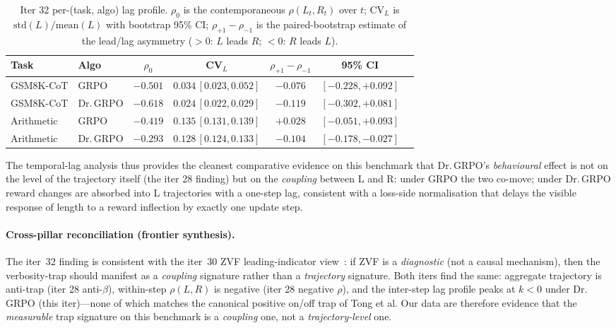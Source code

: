 \documentclass{article}
\begin{document}
\begin{table}[htbp]
\centering\small
\caption{Iter 32 per-(task, algo) lag profile. $\rho_0$ is the
contemporaneous $\rho(L_t,R_t)$ over $t$; CV$_L$ is $\mathrm{std}(L)/\mathrm{mean}(L)$
with bootstrap 95\% CI; $\rho_{+1}{-}\rho_{-1}$ is the paired-bootstrap
estimate of the lead/lag asymmetry ($>0$: $L$ leads $R$; $<0$: $R$
leads $L$).}
\label{tab:length-bias-iter32}
\begin{tabular}{llccccc}
\hline
Task & Algo & $\rho_0$ & CV$_L$ & $\rho_{+1}{-}\rho_{-1}$ & 95\% CI \\
\hline
GSM8K-CoT & GRPO & $-0.501$ & $0.034\,[0.023,0.052]$ & $-0.076$ & $[-0.228,+0.092]$ \\
GSM8K-CoT & Dr.\,GRPO & $-0.618$ & $0.024\,[0.022,0.029]$ & $-0.119$ & $[-0.302,+0.081]$ \\
Arithmetic & GRPO & $-0.419$ & $0.135\,[0.131,0.139]$ & $+0.028$ & $[-0.051,+0.093]$ \\
Arithmetic & Dr.\,GRPO & $-0.293$ & $0.128\,[0.124,0.133]$ & $-0.104$ & $[-0.178,-0.027]$ \\
\hline
\end{tabular}
\end{table}

The temporal-lag analysis thus provides the cleanest comparative
evidence on this benchmark that Dr.\,GRPO's \emph{behavioural} effect is
not on the level of the trajectory itself (the iter 28 finding) but on
the \emph{coupling} between L and R: under GRPO the two co-move; under
Dr.\,GRPO reward changes are absorbed into L trajectories with a
one-step lag, consistent with a loss-side normalisation that delays
the visible response of length to a reward inflection by exactly one
update step.

\paragraph{Cross-pillar reconciliation (frontier synthesis).}
The iter~32 finding is consistent with the iter~30 ZVF leading-indicator
view~\cite{tong2025drgrpo, kimi}: if ZVF is a \emph{diagnostic} (not a
causal mechanism), then the verbosity-trap should manifest as a
\emph{coupling} signature rather than a \emph{trajectory} signature.
Both iters find the same: aggregate trajectory is anti-trap (iter 28
anti-$\beta$), within-step $\rho(L,R)$ is negative (iter 28 negative
$\rho$), and the inter-step lag profile peaks at $k{<}0$ under
Dr.\,GRPO (this iter)---none of which matches the canonical positive
on/off trap of Tong et al. Our data are therefore evidence that the
\emph{measurable} trap signature on this benchmark is a \emph{coupling}
one, not a \emph{trajectory-level} one.
\end{document}
